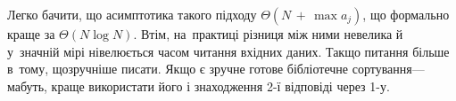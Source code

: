 Легко бачити, що асимптотика такого підходу ${\Theta(N\,{+}\,\max a_j)}$, що формально краще за $\Theta(N\log N)$. Втім, на~практиці різниця між ними невелика й у~значній мірі нівелюється часом читання вхідних даних. Так\nolinebreak[3] що питання більше в~тому, що\nolinebreak[3] зручніше писати. Якщо є зручне готове бібліотечне сортування\nolinebreak[3] --- мабуть, краще використати його і знаходження \mbox{2-ї} відповіді через \mbox{1-у}.
